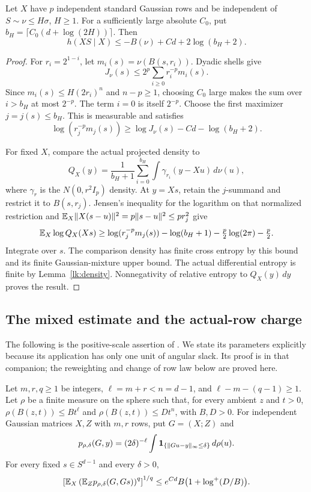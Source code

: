 \begin{lemma}\label{lk:entropy}
Let \(X\) have \(p\) independent standard Gaussian rows and be
independent of \(S\sim\nu\le H\sigma\), \(H\ge1\). For a sufficiently
large absolute \(C_0\), put
\(b_H=\lceil C_0(d+\log(2H))\rceil\). Then
\[
 h(XS\mid X)\le -B(\nu)+Cd+2\log(b_H+2).
\]
\end{lemma}
\begin{proof}
For \(r_i=2^{1-i}\), let \(m_i(s)=\nu(B(s,r_i))\).
Dyadic shells give
\[
 J_\nu(s)\le 2^p\sum_{i\ge0}r_i^{-p}m_i(s).
\]
Since \(m_i(s)\le H(2r_i)^n\) and \(n-p\ge1\), choosing \(C_0\)
large makes the sum over \(i>b_H\) at most \(2^{-p}\).
The term \(i=0\) is itself \(2^{-p}\). Choose the first maximizer
\(j=j(s)\le b_H\). This is measurable and satisfies
\[
 \log(r_j^{-p}m_j(s))
 \ge\log J_\nu(s)-Cd-\log(b_H+2).
\]

For fixed \(X\), compare the actual projected density to
\[
 Q_X(y)=\frac1{b_H+1}\sum_{i=0}^{b_H}
       \int \gamma_{r_i}(y-Xu)\,d\nu(u),
\]
where \(\gamma_r\) is the \(N(0,r^2I_p)\) density. At \(y=Xs\),
retain the \(j\)-summand and restrict it to \(B(s,r_j)\).
Jensen's inequality for the logarithm on that normalized restriction
and \(\mathbb E_X\|X(s-u)\|^2=p\|s-u\|^2\le pr_j^2\) give
\[
 \mathbb E_X\log Q_X(Xs)
 \ge\log(r_j^{-p}m_j(s))-\log(b_H+1)
     -\tfrac p2\log(2\pi)-\tfrac p2.
\]
Integrate over \(s\). The comparison density has finite cross
entropy by this bound and its finite Gaussian-mixture upper bound.
The actual differential entropy is finite by Lemma~\ref{lk:density}.
Nonnegativity of relative entropy to \(Q_X(y)\,dy\) proves the result.
\end{proof}

\subsection{The mixed estimate and the actual-row charge}

The following is the positive-scale assertion of
\cite[Theorem~3.1]{OpenAIRow2026}. We state its parameters explicitly
because its application has only one unit of angular slack. Its proof
is in that companion; the reweighting and change of row law below are
proved here.

\begin{theorem}\label{lk:mixed-input}
Let \(m,r,q\ge1\) be integers, \(\ell=m+r<n=d-1\), and
\(\ell-m-(q-1)\ge1\). Let \(\rho\) be a finite measure on the sphere
such that, for every ambient \(z\) and \(t>0\),
\(\rho(B(z,t))\le Bt^\ell\) and
\(\rho(B(z,t))\le Dt^n\), with \(B,D>0\). For independent Gaussian
matrices \(X,Z\) with \(m,r\) rows, put \(G=(X;Z)\) and
\[
 p_{\rho,\delta}(G,y)=(2\delta)^{-\ell}
      \int\mathbf 1_{\{\|Gu-y\|_\infty\le\delta\}}\,d\rho(u).
\]
For every fixed \(s\in S^{d-1}\) and every \(\delta>0\),
\[
 \left[\mathbb E_X\left(\mathbb E_Zp_{\rho,\delta}(G,Gs)\right)^q\right]^{1/q}
 \le e^{Cd}B\bigl(1+\log^+(D/B)\bigr).
\]
\end{theorem}

